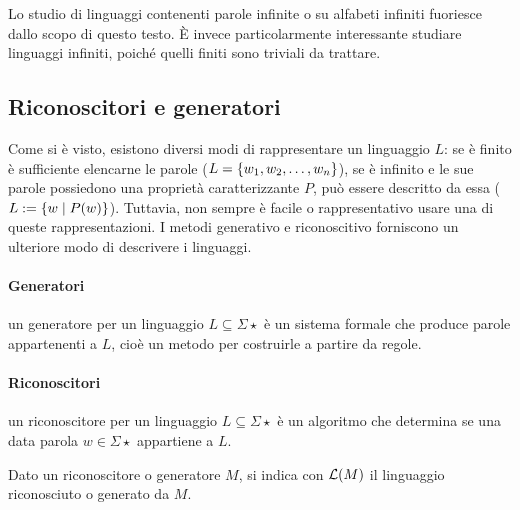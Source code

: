 Lo studio di linguaggi contenenti parole infinite o su alfabeti infiniti fuoriesce dallo scopo di questo testo. È invece particolarmente interessante studiare linguaggi infiniti, poiché quelli finiti sono triviali da trattare.


\subsection*{Riconoscitori e generatori}
Come si è visto, esistono diversi modi di rappresentare un linguaggio $L$: se è finito è sufficiente elencarne le parole ($L=\left\{ w_1,w_2,\dots,w_n \right\}$), se è infinito e le sue parole possiedono una proprietà caratterizzante $P$, può essere descritto da essa ($L:=\left\{ w\mid P(w) \right\}$). Tuttavia, non sempre è facile o rappresentativo usare una di queste rappresentazioni. I metodi generativo e riconoscitivo forniscono un ulteriore modo di descrivere i linguaggi.

\paragraph{Generatori} un generatore per un linguaggio $L\subseteq\Sigma\star$ è un sistema formale che produce parole appartenenti a $L$, cioè un metodo per costruirle a partire da regole.

\paragraph{Riconoscitori} un riconoscitore per un linguaggio $L\subseteq\Sigma\star$ è un algoritmo che determina se una data parola $w\in\Sigma\star$ appartiene a $L$.

Dato un riconoscitore o generatore $M$, si indica con $\mathcal L(M)$ il linguaggio riconosciuto o generato da $M$.



